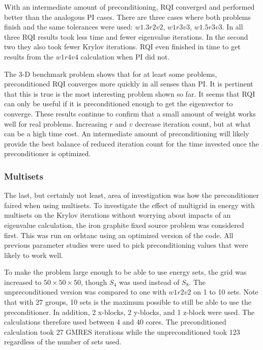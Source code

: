 With an intermediate amount of preconditioning, RQI converged and performed better than the analogous PI cases. There are three cases where both problems finish and the same tolerances were used: $w1.3r2v2$, $w1r3v3$, $w1.5r3v3$. In all three RQI results took less time and fewer eigenvalue iterations. In the second two they also took fewer Krylov iterations. RQI even finished in time to get results from the $w1r4v4$ calculation when PI did not. 

The 3-D benchmark problem shows that for at least some problems, preconditioned RQI converges more quickly in all senses than PI. It is pertinent that this is true is the most interesting problem shown so far. It seems that RQI can only be useful if it is preconditioned enough to get the eigenvector to converge. These results continue to confirm that a small amount of weight works well for real problems. Increasing $r$ and $v$ decrease iteration count, but at what can be a high time cost. An intermediate amount of preconditioning will likely provide the best balance of reduced iteration count for the time invested once the preconditioner is optimized. 

\subsubsection{Multisets}
The last, but certainly not least, area of investigation was how the preconditioner faired when using multisets. To investigate the effect of multigrid in energy with multisets on the Krylov iterations without worrying about impacts of an eigenvalue calculation, the iron graphite fixed source problem was considered first. This was run on orhtanc using an optimized version of the code. All previous parameter studies were used to pick preconditioning values that were likely to work well. 

To make the problem large enough to be able to use energy sets, the grid was increased to $50 \times 50 \times 50$, though $S_{4}$ was used instead of $S_{8}$. The unpreconditioned version was compared to one with $w1r2v2$ on 1 to 10 sets. Note that with 27 groups, 10 sets is the maximum possible to still be able to use the preconditioner. In addition, 2 x-blocks, 2 y-blocks, and 1 z-block were used. The calculations therefore used between 4 and 40 cores. The preconditioned calculation took 27 GMRES iterations while the unpreconditioned took 123 regardless of the number of sets used.

